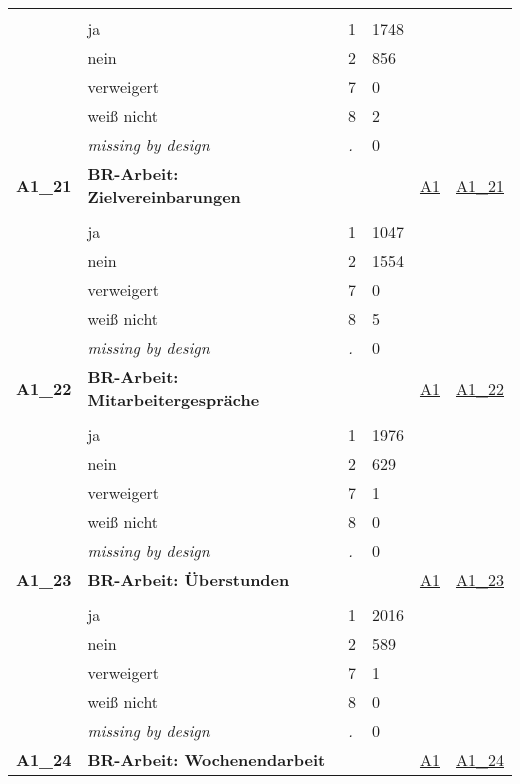 \begin{longtable}{| L{2.45cm} | L{6cm} | C{1.5cm} | R{1cm} | C{2.25cm} | C{2.25cm} |}
   &  &  &  &  &  \\ 
   & ja & 1 & 1748 &  &  \\ 
   & nein & 2 & 856 &  &  \\ 
   & verweigert & 7 & 0 &  &  \\ 
   & weiß nicht & 8 & 2 &  &  \\ 
   & \textit{missing by design} & \textit{.} & 0 &  &  \\ 
   \midrule
\textbf{A1\_21}\label{var:A1:21} & \textbf{BR-Arbeit: Zielvereinbarungen} &  &  & \hyperref[A1]{A1} & \hyperref[var:suf:A1:21]{A1\_21} \\ 
   &  &  &  &  &  \\ 
   & ja & 1 & 1047 &  &  \\ 
   & nein & 2 & 1554 &  &  \\ 
   & verweigert & 7 & 0 &  &  \\ 
   & weiß nicht & 8 & 5 &  &  \\ 
   & \textit{missing by design} & \textit{.} & 0 &  &  \\ 
   \midrule
\textbf{A1\_22}\label{var:A1:22} & \textbf{BR-Arbeit: Mitarbeitergespräche} &  &  & \hyperref[A1]{A1} & \hyperref[var:suf:A1:22]{A1\_22} \\ 
   &  &  &  &  &  \\ 
   & ja & 1 & 1976 &  &  \\ 
   & nein & 2 & 629 &  &  \\ 
   & verweigert & 7 & 1 &  &  \\ 
   & weiß nicht & 8 & 0 &  &  \\ 
   & \textit{missing by design} & \textit{.} & 0 &  &  \\ 
   \midrule
\textbf{A1\_23}\label{var:A1:23} & \textbf{BR-Arbeit: Überstunden} &  &  & \hyperref[A1]{A1} & \hyperref[var:suf:A1:23]{A1\_23} \\ 
   &  &  &  &  &  \\ 
   & ja & 1 & 2016 &  &  \\ 
   & nein & 2 & 589 &  &  \\ 
   & verweigert & 7 & 1 &  &  \\ 
   & weiß nicht & 8 & 0 &  &  \\ 
   & \textit{missing by design} & \textit{.} & 0 &  &  \\ 
   \midrule
\textbf{A1\_24}\label{var:A1:24} & \textbf{BR-Arbeit: Wochenendarbeit} &  &  & \hyperref[A1]{A1} & \hyperref[var:suf:A1:24]{A1\_24} \\ 

\end{longtable}
